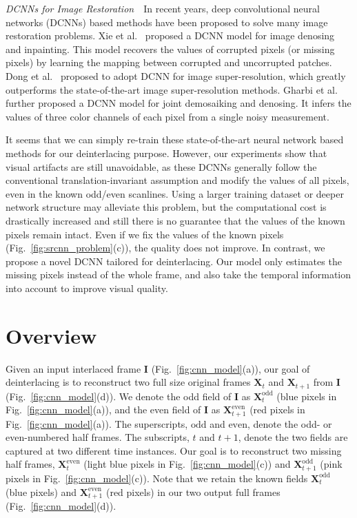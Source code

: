 \documentclass[acmtog]{acmart}
\begin{document}
\vspace{0.15in}

\noindent\emph{DCNNs for Image Restoration}\,\,\,\, In recent years, 
deep convolutional neural networks (DCNNs) based methods have been proposed to solve 
many image restoration problems.
Xie et al.~ proposed a DCNN model for
image denosing and inpainting. This model recovers the values of corrupted
pixels (or missing pixels) by learning the mapping between corrupted and
uncorrupted patches. Dong et al.~ proposed to adopt
DCNN for image super-resolution, which greatly outperforms the state-of-the-art
image super-resolution methods. Gharbi et al.~ further
proposed a DCNN model for joint demosaiking and denosing. It infers
the values of three color channels of each pixel from a single noisy
measurement.



It seems that we can simply re-train these state-of-the-art 
neural network based methods for our deinterlacing purpose. 
However, our experiments show that visual artifacts are still unavoidable, as 
these DCNNs generally follow the conventional translation-invariant assumption and
modify the values of all pixels, even in the known odd/even scanlines.  Using a larger
training dataset or deeper network structure may alleviate this problem, but the
computational cost is drastically increased and still there is no guarantee 
that the values of the known pixels remain intact. 
Even if we fix the values of the known pixels (Fig.~\ref{fig:srcnn_problem}(c)), 
the quality does not improve. 
In contrast, we propose a novel DCNN tailored for deinterlacing.
Our model only estimates the missing pixels instead of the whole frame, and also
take the temporal information into account to improve visual quality.

 \section{Overview}
Given an input interlaced frame $\mathbf{I}$ (Fig.~\ref{fig:cnn_model}(a)),  our
goal of deinterlacing is to reconstruct two full size original frames
$\mathbf{X}_t$ and $\mathbf{X}_{t+1}$ from $\mathbf{I}$
(Fig.~\ref{fig:cnn_model}(d)). We denote the odd field of $\mathbf{I}$ as
$\mathbf{X}^{\text{odd}}_t$ (blue pixels in Fig.~\ref{fig:cnn_model}(a)), and
the even field of $\mathbf{I}$ as $\mathbf{X}^{\text{even}}_{t+1}$ (red pixels in
Fig.~\ref{fig:cnn_model}(a)). The superscripts, $\text{odd}$ and $\text{even}$,
denote the odd- or even-numbered half frames. The subscripts, $t$ and $t+1$,
denote the two fields are captured at two different time instances. Our goal is
to reconstruct two missing half frames, $\mathbf{X}^{\text{even}}_t$ (light blue
pixels in Fig.~\ref{fig:cnn_model}(c)) and $\mathbf{X}^{\text{odd}}_{t+1}$ (pink
pixels in Fig.~\ref{fig:cnn_model}(c)). Note that we retain the known fields
$\mathbf{X}^{\text{odd}}_t$  (blue pixels) and $\mathbf{X}^{\text{even}}_{t+1}$
(red pixels) in our two output full frames (Fig.~\ref{fig:cnn_model}(d)).
\end{document}
